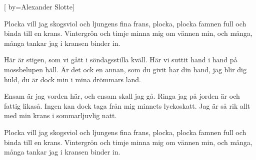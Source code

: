 


[ 	%
	by={Alexander Slotte}]		%
	
\beginverse*		%
Plocka vill jag skogsviol och 
ljungens fina frans, 
plocka, plocka famnen full och 
binda till en krans. 
Vintergrön och timje 
minna mig om vännen min, och 
många, många tankar jag i 
kransen binder in. 
\endverse			%

\beginverse*		%
Här är stigen, som vi gått i 
söndagsstilla kväll. 
Här vi suttit hand i hand på 
mossbelupen häll. 
Är det ock en annan, 
som du givit har din hand, 
jag blir dig huld, du är dock min i 
mina drömmars land. 
\endverse			%

\beginverse*		%
Ensam är jag vorden här, och 
ensam skall jag gå. 
Ringa jag på jorden är och 
fattig likaså. 
Ingen kan dock taga 
från mig minnets lyckoskatt. Jag 
är så rik allt med min krans i 
sommarljuvlig natt. 
\endverse			%

\beginverse*		%
Plocka vill jag skogsviol och 
ljungens fina frans, 
plocka, plocka famnen full och 
binda till en krans. 
Vintergrön och timje 
minna mig om vännen min, och 
många, många tankar jag i 
kransen binder in. 
\endverse			%
\endsong			%
